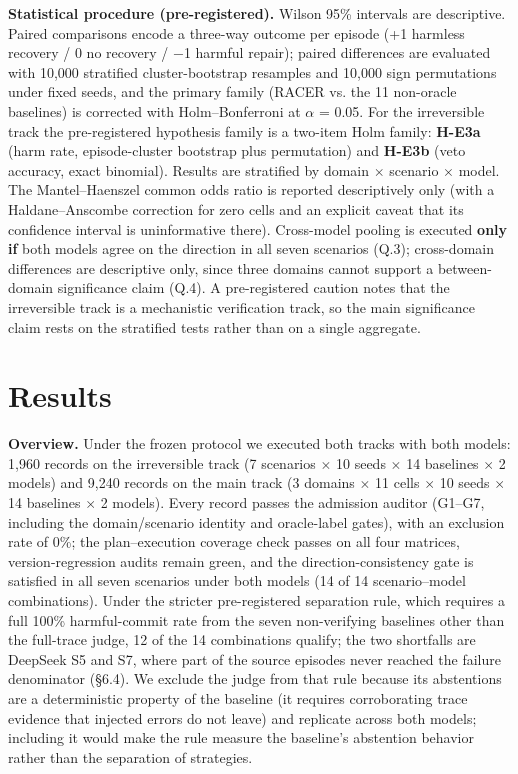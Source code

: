 \documentclass[review]{fcs}
\begin{document}
\textbf{Statistical procedure (pre-registered).} Wilson 95\% intervals are descriptive. Paired comparisons encode a three-way outcome per episode (+1 harmless recovery / 0 no recovery / $-$1 harmful repair); paired differences are evaluated with 10,000 stratified cluster-bootstrap resamples and 10,000 sign permutations under fixed seeds, and the primary family (RACER vs. the 11 non-oracle baselines) is corrected with Holm--Bonferroni at $\alpha$ = 0.05. For the irreversible track the pre-registered hypothesis family is a two-item Holm family: \textbf{H-E3a} (harm rate, episode-cluster bootstrap plus permutation) and \textbf{H-E3b} (veto accuracy, exact binomial). Results are stratified by domain $\times$ scenario $\times$ model. The Mantel--Haenszel common odds ratio is reported descriptively only (with a Haldane--Anscombe correction for zero cells and an explicit caveat that its confidence interval is uninformative there). Cross-model pooling is executed \textbf{only if} both models agree on the direction in all seven scenarios (Q.3); cross-domain differences are descriptive only, since three domains cannot support a between-domain significance claim (Q.4). A pre-registered caution notes that the irreversible track is a mechanistic verification track, so the main significance claim rests on the stratified tests rather than on a single aggregate.

\section{Results}

\textbf{Overview.} Under the frozen protocol we executed both tracks with both models: 1,960 records on the irreversible track (7 scenarios $\times$ 10 seeds $\times$ 14 baselines $\times$ 2 models) and 9,240 records on the main track (3 domains $\times$ 11 cells $\times$ 10 seeds $\times$ 14 baselines $\times$ 2 models). Every record passes the admission auditor (G1--G7, including the domain/scenario identity and oracle-label gates), with an exclusion rate of 0\%; the plan--execution coverage check passes on all four matrices, version-regression audits remain green, and the direction-consistency gate is satisfied in all seven scenarios under both models (14 of 14 scenario--model combinations). Under the stricter pre-registered separation rule, which requires a full 100\% harmful-commit rate from the seven non-verifying baselines other than the full-trace judge, 12 of the 14 combinations qualify; the two shortfalls are DeepSeek S5 and S7, where part of the source episodes never reached the failure denominator (\S6.4). We exclude the judge from that rule because its abstentions are a deterministic property of the baseline (it requires corroborating trace evidence that injected errors do not leave) and replicate across both models; including it would make the rule measure the baseline's abstention behavior rather than the separation of strategies.
\end{document}
